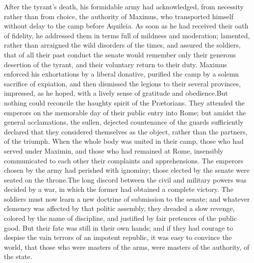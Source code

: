 After the tyrant’s death, his formidable army had acknowledged,
from necessity rather than from choice, the authority of Maximus,
who transported himself without delay to the camp before
Aquileia. As soon as he had received their oath of fidelity, he
addressed them in terms full of mildness and moderation;
lamented, rather than arraigned the wild disorders of the times,
and assured the soldiers, that of all their past conduct the
senate would remember only their generous desertion of the
tyrant, and their voluntary return to their duty. Maximus
enforced his exhortations by a liberal donative, purified the
camp by a solemn sacrifice of expiation, and then dismissed the
legions to their several provinces, impressed, as he hoped, with
a lively sense of gratitude and obedience.\footnotemark[41] But nothing could
reconcile the haughty spirit of the Prætorians. They attended the
emperors on the memorable day of their public entry into Rome;
but amidst the general acclamations, the sullen, dejected
countenance of the guards sufficiently declared that they
considered themselves as the object, rather than the partners, of
the triumph. When the whole body was united in their camp, those
who had served under Maximin, and those who had remained at Rome,
insensibly communicated to each other their complaints and
apprehensions. The emperors chosen by the army had perished with
ignominy; those elected by the senate were seated on the throne.\footnotemark[42]
The long discord between the civil and military powers was
decided by a war, in which the former had obtained a complete
victory. The soldiers must now learn a new doctrine of submission
to the senate; and whatever clemency was affected by that politic
assembly, they dreaded a slow revenge, colored by the name of
discipline, and justified by fair pretences of the public good.
But their fate was still in their own hands; and if they had
courage to despise the vain terrors of an impotent republic, it
was easy to convince the world, that those who were masters of
the arms, were masters of the authority, of the state.



